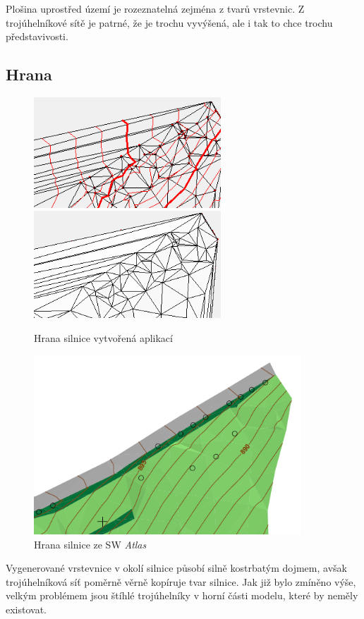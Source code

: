 \documentclass[a4paper, 12pt]{article}
\begin{document}
Plošina uprostřed území je rozeznatelná zejména z tvarů vrstevnic. Z trojúhelníkové sítě je patrné, že je trochu vyvýšená, ale i tak to chce trochu představivosti.

\subsection{Hrana}
\begin{figure}[h!]
	\centering
	\includegraphics[width=7cm]{./pictures/kupec_edge_contours.png}
	\includegraphics[width=7cm]{./pictures/kupec_edge_slope.png}
	\caption{Hrana silnice vytvořená aplikací}
\end{figure}

\begin{figure}[h!]
	\centering
	\includegraphics[width=10cm]{./pictures/atlas_edge.png}
	\caption{Hrana silnice ze SW \textit{Atlas}}
\end{figure}

Vygenerované vrstevnice v okolí silnice působí silně kostrbatým dojmem, avšak trojúhel\-ní\-ko\-vá síť poměrně věrně kopíruje tvar silnice. Jak již bylo zmíněno výše, velkým pro\-blé\-mem jsou štíhlé trojúhelníky v horní části modelu, které by neměly existovat.
\end{document}
